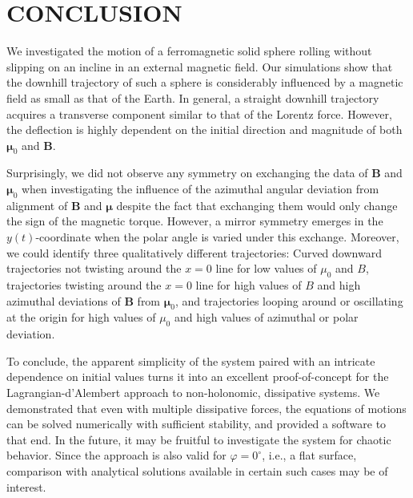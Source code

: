 \section{CONCLUSION}
\label{sec:conclusion}
We investigated the motion of a ferromagnetic solid sphere rolling without slipping on an incline in an external magnetic field. Our simulations show that the downhill trajectory of such a sphere is considerably influenced by a magnetic field as small as that of the Earth. In general, a straight downhill trajectory acquires a transverse component similar to that of the Lorentz force. However, the deflection is highly dependent on the initial direction and magnitude of both $\bm{\mu}_0$ and $\bm{B}$. 

Surprisingly, we did not observe any symmetry on exchanging the data of $\bm{B}$ and $\bm{\mu}_0$ when investigating the influence of the azimuthal angular deviation from alignment of $\bm{B}$ and $\bm{\mu}$ despite the fact that exchanging them would only change the sign of the magnetic torque. However, a mirror symmetry emerges in the $y(t)$-coordinate when the polar angle is varied under this exchange. Moreover, we could identify three qualitatively different trajectories: Curved downward trajectories not twisting around the $x=0$ line for low values of $\mu_0$ and $B$, trajectories twisting around the $x=0$ line for high values of $B$ and high azimuthal deviations of $\bm{B}$ from $\bm{\mu}_0$, and trajectories looping around or oscillating at the origin for high values of $\mu_0$ and high values of azimuthal or polar deviation. 

To conclude, the apparent simplicity of the system paired with an intricate dependence on initial values turns it into an excellent proof-of-concept for the Lagrangian-d'Alembert approach to non-holonomic, dissipative systems. We demonstrated that even with multiple dissipative forces, the equations of motions can be solved numerically with sufficient stability, and provided a software to that end. In the future, it may be fruitful to investigate the system for chaotic behavior. Since the approach is also valid for $\varphi = 0^\circ$, i.e., a flat surface, comparison with analytical solutions available in certain such cases may be of interest.